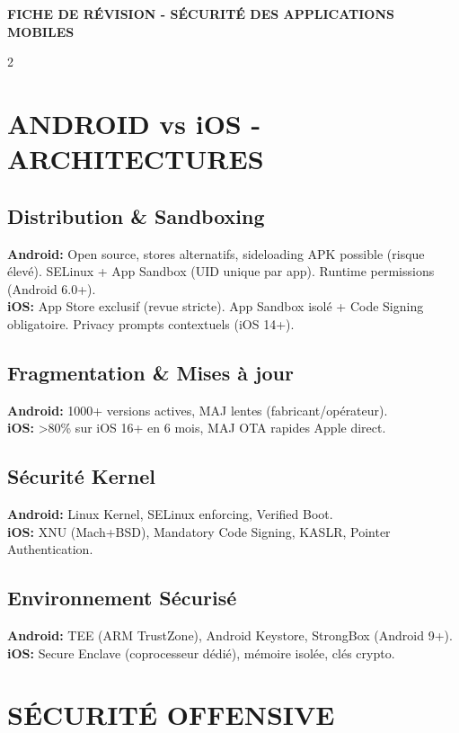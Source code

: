 \documentclass[9pt,a4paper]{extarticle}
\begin{document}
\begin{center}
\textbf{\large FICHE DE RÉVISION - SÉCURITÉ DES APPLICATIONS MOBILES}
\end{center}

\begin{multicols}{2}

\section*{ANDROID vs iOS - ARCHITECTURES}

\subsection*{Distribution \& Sandboxing}
\textbf{Android:} Open source, stores alternatifs, sideloading APK possible (risque élevé). SELinux + App Sandbox (UID unique par app). Runtime permissions (Android 6.0+).\\
\textbf{iOS:} App Store exclusif (revue stricte). App Sandbox isolé + Code Signing obligatoire. Privacy prompts contextuels (iOS 14+).

\subsection*{Fragmentation \& Mises à jour}
\textbf{Android:} 1000+ versions actives, MAJ lentes (fabricant/opérateur).\\
\textbf{iOS:} >80\% sur iOS 16+ en 6 mois, MAJ OTA rapides Apple direct.

\subsection*{Sécurité Kernel}
\textbf{Android:} Linux Kernel, SELinux enforcing, Verified Boot.\\
\textbf{iOS:} XNU (Mach+BSD), Mandatory Code Signing, KASLR, Pointer Authentication.

\subsection*{Environnement Sécurisé}
\textbf{Android:} TEE (ARM TrustZone), Android Keystore, StrongBox (Android 9+).\\
\textbf{iOS:} Secure Enclave (coprocesseur dédié), mémoire isolée, clés crypto.

\section*{SÉCURITÉ OFFENSIVE}


\end{multicols}
\end{document}
